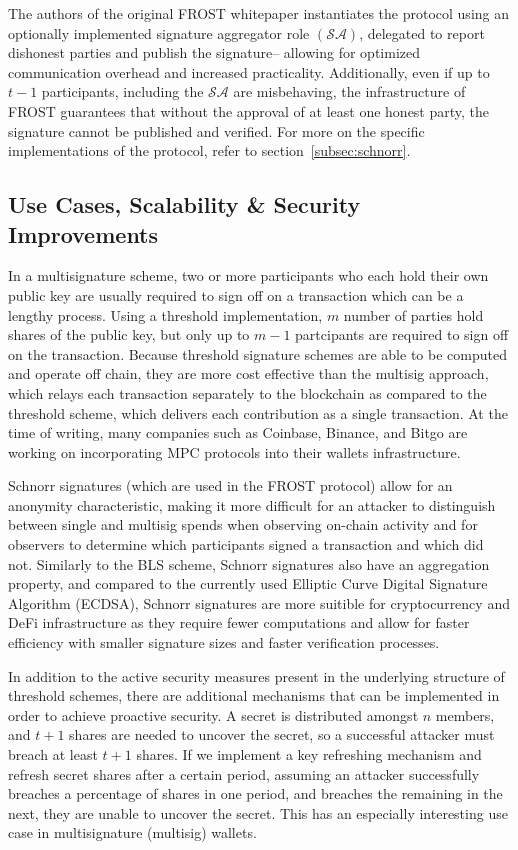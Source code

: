 \documentclass[12pt]{article}
\begin{document}
The authors of the original FROST whitepaper instantiates the protocol using an optionally implemented signature aggregator role \( (\mathcal{SA})\), delegated to report dishonest parties and publish the signature-- allowing for optimized communication overhead and increased practicality. Additionally, even if up to \(t-1\) participants, including the \( \mathcal{SA}\) are misbehaving, the infrastructure of FROST guarantees that without the approval of at least one honest party, the signature cannot be published and verified. For more on the specific implementations of the protocol, refer to section~\ref{subsec:schnorr}.

\subsection{Use Cases, Scalability \& Security Improvements}

In a multisignature scheme, two or more participants who each hold their own public key are usually required to sign off on a transaction which can be a lengthy process. Using a threshold implementation, \(m\) number of parties hold shares of the public key, but only up to \(m-1\) partcipants are required to sign off on the transaction. Because threshold signature schemes are able to be computed and operate off chain, they are more cost effective than the multisig approach, which relays each transaction separately to the blockchain as compared to the threshold scheme, which delivers each contribution as a single transaction. At the time of writing, many companies such as Coinbase, Binance, and Bitgo are working on incorporating MPC protocols into their wallets infrastructure. 

Schnorr signatures (which are used in the FROST protocol) allow for an anonymity characteristic, making it more difficult for an attacker to distinguish between single and multisig spends when observing on-chain activity and for observers to determine which participants signed a transaction and which did not. Similarly to the BLS scheme, Schnorr signatures also have an aggregation property, and compared to the currently used Elliptic Curve Digital Signature Algorithm (ECDSA), Schnorr signatures are more suitible for cryptocurrency and DeFi infrastructure as they require fewer computations and allow for faster efficiency with smaller signature sizes and faster verification processes.  

In addition to the active security measures present in the underlying structure of threshold schemes, there are additional mechanisms that can be implemented in order to achieve proactive security. A secret is distributed amongst \(n\) members, and \(t+1\) shares are needed to uncover the secret, so a successful attacker must breach at least \(t+1\) shares. If we implement a key refreshing mechanism and refresh secret shares after a certain period, assuming an attacker successfully breaches a percentage of shares in one period, and breaches the remaining in the next, they are unable to uncover the secret. This has an especially interesting use case in multisignature (multisig) wallets. 
\end{document}
